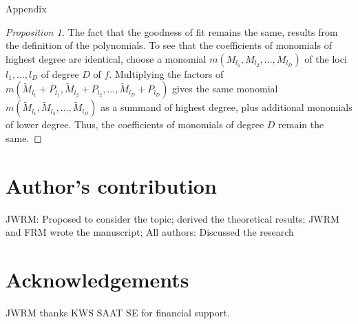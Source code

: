 \documentclass{bmcart}
\newcommand{\0}{\mathbf{0}}
\begin{document}

\newpage
\begin{center} {\huge Appendix } \end{center}
\vspace{0.5cm}
\begin{proof}[Proposition 1]
	The fact that the goodness of fit remains the same, results from the definition of the polynomials. To see that the coefficients of monomials of highest degree are identical, choose a monomial $m(M_{l_1},M_{l_2},...,M_{l_D})$ of the loci $l_1,...,l_D$ of degree $D$ of $f$. Multiplying the factors of $m(\tilde{M}_{l_1}+P_{l_1},\tilde{M}_{l_2}+P_{l_2},...,\tilde{M}_{l_D}+P_{l_D})$ gives the same monomial 
	$m(\tilde{M}_{l_1},\tilde{M}_{l_2},...,\tilde{M}_{l_D})$ as a summand of highest degree, plus additional monomials of lower degree. Thus, the coefficients of monomials of degree $D$ remain the same. 
\end{proof}
\section*{Author's contribution}
JWRM: Proposed to consider the topic; derived the theoretical results; JWRM and FRM wrote the manuscript;
All authors: Discussed the research



\section*{Acknowledgements}
JWRM thanks KWS SAAT SE for financial support.

\end{document}
